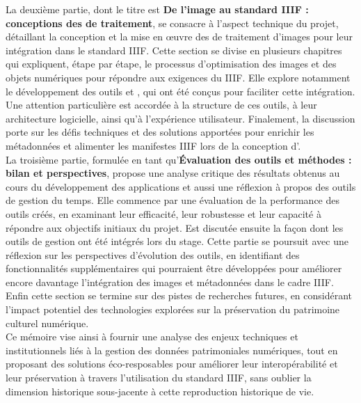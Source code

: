     La deuxième partie, dont le titre est \textbf{De l'image au standard IIIF : conceptions des  de traitement}, se consacre à l'aspect technique du projet, détaillant la conception et la mise en œuvre des  de traitement d'images pour leur intégration dans le standard IIIF. Cette section se divise en plusieurs chapitres qui expliquent, étape par étape, le processus d'optimisation des images et des objets numériques pour répondre aux exigences du IIIF. Elle explore notamment le développement des outils \cvt et \msh, qui ont été conçus pour faciliter cette intégration. Une attention particulière est accordée à la structure de ces outils, à leur architecture logicielle, ainsi qu'à l'expérience utilisateur. Finalement, la discussion porte sur les défis techniques et des solutions apportées pour enrichir les métadonnées et alimenter les manifestes IIIF lors de la conception d'\diiif.\\
    
    La troisième partie, formulée en tant qu'\textbf{Évaluation des outils et méthodes : bilan et perspectives}, propose une analyse critique des résultats obtenus au cours du développement des applications et aussi une réflexion à propos des outils de gestion du temps. Elle commence par une évaluation de la performance des outils créés, en examinant leur efficacité, leur robustesse et leur capacité à répondre aux objectifs initiaux du projet. Est discutée ensuite la façon dont les outils de gestion ont été intégrés lors du stage. Cette partie se poursuit avec une réflexion sur les perspectives d'évolution des outils, en identifiant des fonctionnalités supplémentaires qui pourraient être développées pour améliorer encore davantage l'intégration des images et métadonnées dans le cadre IIIF. Enfin cette section se termine sur des pistes de recherches futures, en considérant l'impact potentiel des technologies explorées sur la préservation du patrimoine culturel numérique.\\
    
    Ce mémoire vise ainsi à fournir une analyse des enjeux techniques et institutionnels liés à la gestion des données patrimoniales numériques, tout en proposant des solutions éco-resposables pour améliorer leur interopérabilité et leur préservation à travers l'utilisation du standard IIIF, sans oublier la dimension historique sous-jacente à cette reproduction historique de vie.
